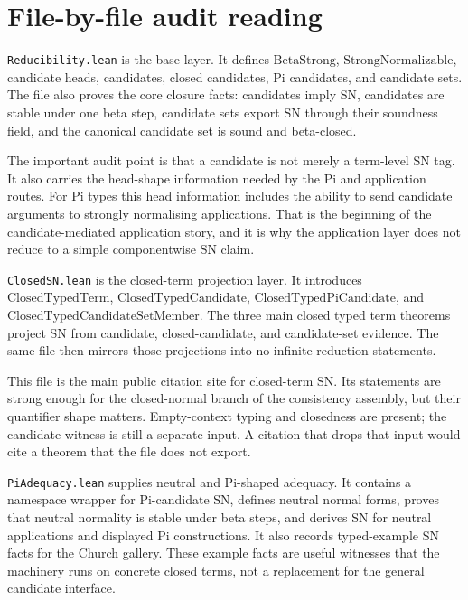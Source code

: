 \section{File-by-file audit reading}
\label{sec:metacic-normalization-audit-map-file-reading}

\texttt{Reducibility.lean} is the base layer. It defines
$\mathrm{BetaStrong}$, $\mathrm{StrongNormalizable}$, candidate heads,
candidates, closed candidates, Pi candidates, and candidate sets. The file also
proves the core closure facts: candidates imply SN, candidates are stable under
one beta step, candidate sets export SN through their soundness field, and the
canonical candidate set is sound and beta-closed.

The important audit point is that a candidate is not merely a term-level SN
tag. It also carries the head-shape information needed by the Pi and application
routes. For Pi types this head information includes the ability to send
candidate arguments to strongly normalising applications. That is the beginning
of the candidate-mediated application story, and it is why the application layer
does not reduce to a simple componentwise SN claim.

\texttt{ClosedSN.lean} is the closed-term projection layer. It introduces
$\mathrm{ClosedTypedTerm}$, $\mathrm{ClosedTypedCandidate}$,
$\mathrm{ClosedTypedPiCandidate}$, and
$\mathrm{ClosedTypedCandidateSetMember}$. The three main closed typed term
theorems project SN from candidate, closed-candidate, and candidate-set evidence.
The same file then mirrors those projections into no-infinite-reduction
statements.

This file is the main public citation site for closed-term SN. Its statements
are strong enough for the closed-normal branch of the consistency assembly, but
their quantifier shape matters. Empty-context typing and closedness are present;
the candidate witness is still a separate input. A citation that drops that input
would cite a theorem that the file does not export.

\texttt{PiAdequacy.lean} supplies neutral and Pi-shaped adequacy. It contains a
namespace wrapper for Pi-candidate SN, defines neutral normal forms, proves that
neutral normality is stable under beta steps, and derives SN for neutral
applications and displayed Pi constructions. It also records typed-example SN
facts for the Church gallery. These example facts are useful witnesses that the
machinery runs on concrete closed terms, not a replacement for the general
candidate interface.

